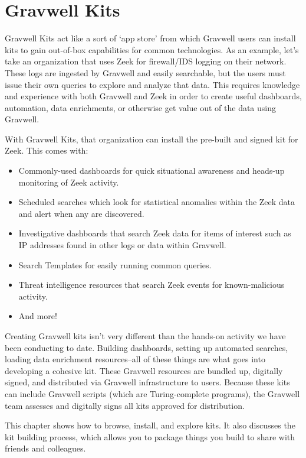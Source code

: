 \chapter{Gravwell Kits}
\label{ch:kits}

Gravwell Kits act like a sort of `app store' from which Gravwell users can
install kits to gain out-of-box capabilities for common technologies. As
an example, let's take an organization that uses Zeek for firewall/IDS
logging on their network. These logs are ingested by Gravwell and easily
searchable, but the users must issue their own queries to explore and
analyze that data. This requires knowledge and experience with both
Gravwell and Zeek in order to create useful dashboards, automation,
data enrichments, or otherwise get value out of the data using Gravwell.

With Gravwell Kits, that organization can install the pre-built and
signed kit for Zeek. This comes with:

\begin{itemize}
\tightlist
\item
  Commonly-used dashboards for quick situational awareness and heads-up
  monitoring of Zeek activity.
\item
  Scheduled searches which look for statistical anomalies within the
  Zeek data and alert when any are discovered.
\item
  Investigative dashboards that search Zeek data for items of interest
  such as IP addresses found in other logs or data within Gravwell.
\item
  Search Templates for easily running common queries.
\item
  Threat intelligence resources that search Zeek events for
  known-malicious activity.
\item
  And more!
\end{itemize}

Creating Gravwell kits isn't very different than the hands-on activity we
have been conducting to date. Building dashboards, setting up automated
searches, loading data enrichment resources--all of these things are
what goes into developing a cohesive kit. These Gravwell resources are
bundled up, digitally signed, and distributed via Gravwell infrastructure
to users. Because these kits can include Gravwell scripts (which are
Turing-complete programs), the Gravwell team assesses and digitally
signs all kits approved for distribution.

This chapter shows how to browse, install, and explore kits. It also
discusses the kit building process, which allows you to package things
you build to share with friends and colleagues.

